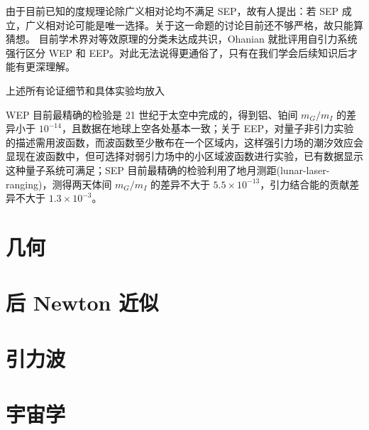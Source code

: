  由于目前已知的度规理论除广义相对论均不满足 SEP，故有人提出：若 SEP 成立，广义相对论可能是唯一选择。关于这一命题的讨论目前还不够严格，故只能算猜想。
目前学术界对等效原理的分类未达成共识，Ohanian\cite{Ohanian} 就批评用自引力系统强行区分 WEP 和 EEP。对此无法说得更通俗了，只有在我们学会后续知识后才能有更深理解。

上述所有论证细节和具体实验均放入

WEP 目前最精确的检验是 21 世纪于太空中完成的，得到铝、铂间 $m_G/m_I$ 的差异小于 $10^{-14}$，且数据在地球上空各处基本一致；关于 EEP，对量子非引力实验的描述需用波函数，而波函数至少散布在一个区域内，这样强引力场的潮汐效应会显现在波函数中，但可选择对弱引力场中的小区域波函数进行实验，已有数据显示这种量子系统可满足；SEP 目前最精确的检验利用了地月测距(lunar-laser-ranging)，测得两天体间 $m_G/m_I$ 的差异不大于 $5.5\times 10^{-13}$，引力结合能的贡献差异不大于 $1.3\times 10^{-3}$。


\section{几何}


\section{后 Newton 近似}

\section{引力波}

\section{宇宙学}